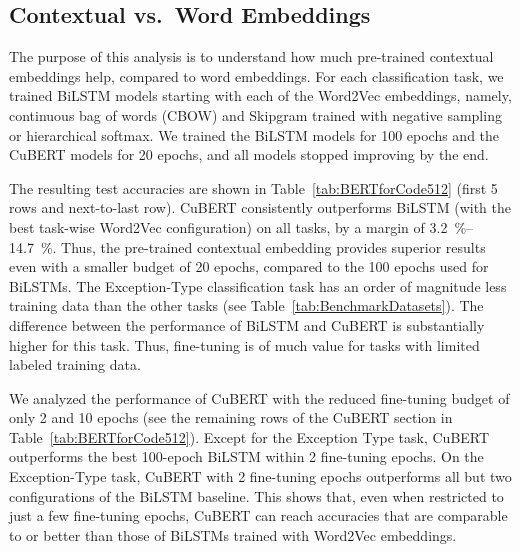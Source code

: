 \documentclass{article}
\newcommand{\BERTforCode}{CuBERT\xspace}
\newcommand{\update}[1]{#1}
\begin{document}
\begin{table*}
\caption{\label{tab:BERTforCode512} \update{Test accuracies of fine-tuned \BERTforCode against BiLSTM (with and without Word2Vec embeddings) and Transformer trained from scratch {on the classification tasks}.} ``ns" and ``hs" respectively refer to negative sampling and hierarchical softmax settings used for training CBOW and Skipgram models. ``From scratch" refers to training with freshly initialized token embeddings, without pre-training.}
\end{table*}

\subsection{Contextual vs.\ Word Embeddings}
\label{sec:BERTforCodeVsWord2Vec}
The purpose of this analysis is to understand how much pre-trained contextual embeddings help, compared to word embeddings.
For each {classification} task, we trained BiLSTM models starting with each of the Word2Vec embeddings, namely, continuous bag of words (CBOW) and Skipgram trained with negative sampling or hierarchical softmax.
We trained the BiLSTM models for \num{100} epochs and the \BERTforCode models for \num{20} epochs,
and all models stopped improving by the end.

The resulting test accuracies are shown in Table~\ref{tab:BERTforCode512} (first 5 rows and next-to-last row). \BERTforCode consistently outperforms BiLSTM (with the best task-wise Word2Vec configuration) on all tasks, by a margin of \update{\SIrange{3.2}{14.7}{\percent}}. Thus, the pre-trained contextual embedding provides superior results even with a smaller budget of \num{20} epochs, compared to the \num{100} epochs used for BiLSTMs.
The Exception-Type classification task has an order of magnitude less training data than the other tasks (see Table~\ref{tab:BenchmarkDatasets}). The difference between the performance of BiLSTM and \BERTforCode is substantially higher for this task. Thus, fine-tuning is of much value for tasks with limited labeled training data.



We analyzed the performance of \BERTforCode with the reduced fine-tuning budget of only 2 and 10 epochs (see the remaining rows of the \BERTforCode section in Table~\ref{tab:BERTforCode512}). \update{Except for the Exception Type task, \BERTforCode outperforms the best 100-epoch BiLSTM within 2 fine-tuning epochs. On the Exception-Type task, \BERTforCode with 2 fine-tuning epochs outperforms all but two configurations of the BiLSTM baseline.
This shows that, even when restricted to just a few fine-tuning epochs, \BERTforCode can reach accuracies that are comparable to or better than those of BiLSTMs trained with Word2Vec embeddings.}
\end{document}
